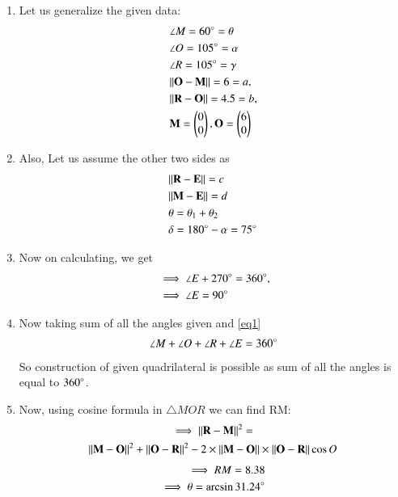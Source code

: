 \documentclass[journal,12pt,twocolumn]{IEEEtran}
\newcommand{\myvec}[1]{\ensuremath{\begin{pmatrix}#1\end{pmatrix}}}
\begin{document}
\begin{enumerate}
\item  Let us generalize the given data:
    \begin{align}
    &\angle M= 60\degree=\theta \label{eq1}
    \\
    &\angle O= 105\degree=\alpha
    \\
    &\angle R= 105\degree=\gamma \label{eq2}
    \\
    &\norm{\vec{O}-\vec{M}} =6=a, \label{eq3}
    \\
    &\norm{\vec{R}-\vec{O}} =4.5=b,\label{eq4}
    \\
    &\vec{M}=\myvec{0\\0}, \vec{O}=\myvec{6\\0}
    \end{align}
    \item Also, Let us assume the other two sides as
\begin{align}
 &\Vert\mathbf{R}-\mathbf{E}\rVert=c
 \\
  &\Vert\mathbf{M}-\mathbf{E}\rVert =d 
  \\
  &\theta= \theta_1 + \theta_2
  \\
  &\delta= 180\degree-\alpha = 75\degree
\end{align}  
    \item Now on calculating, we get
\begin{align}
&\implies \angle E + 270\degree  = 360\degree,
\\
&\implies \angle E = 90\degree\label{eq1}
\end{align}
 \item Now taking sum of all the angles given and \eqref{eq1}  
\begin{align}
\angle M + \angle O +\angle R +\angle E =360\degree
\end{align}
So construction of given quadrilateral is possible as sum of all the angles is equal to $360\degree$.\\
 \item Now, using cosine formula in $\triangle MOR$ we can find RM:
\begin{multline}
\implies {\Vert\mathbf{R}-\mathbf{M}\rVert^2}=
\\
{\Vert\mathbf{M}-\mathbf{O}\rVert^2}+ \Vert\mathbf{O}-\mathbf{R}\rVert^2-2\times\Vert\mathbf{M}-\mathbf{O}\rVert \times \Vert\mathbf{O}-\mathbf{R}\rVert\cos{O}
\end{multline}
\begin{align}
\implies RM=8.38\\
\implies \theta= \arcsin 31.24\degree

\end{align}
\end{enumerate}
\end{document}
